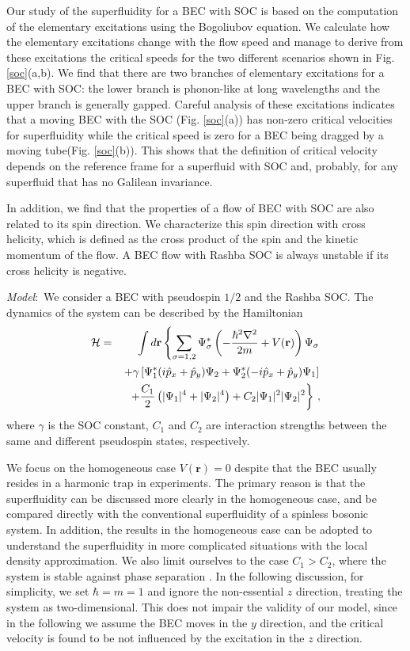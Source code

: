 \documentclass[doublecol]{epl2}
\begin{document}
Our study of the superfluidity for a BEC with SOC is based on the
computation of the elementary excitations using the Bogoliubov equation. We
calculate how the elementary excitations change with the flow speed and
manage to derive from these excitations the critical speeds for the two
different scenarios shown in Fig. \ref{soc}(a,b). We find that there are two
branches of elementary excitations for a BEC with SOC: the lower branch is
phonon-like at long wavelengths and the upper branch is generally gapped.
Careful analysis of these excitations indicates that a moving BEC with the
SOC (Fig. \ref{soc}(a)) has non-zero critical velocities for superfluidity
while the critical speed is zero for a BEC being dragged by a moving
tube(Fig. \ref{soc}(b)). This shows that the definition of critical velocity
depends on the reference frame for a superfluid with SOC and, probably, for
any superfluid that has no Galilean invariance.

In addition, we find that the properties of a flow of BEC with SOC are also
related to its spin direction. We characterize this spin direction with
cross helicity, which is defined as the cross product of the spin and the
kinetic momentum of the flow. A BEC flow with Rashba SOC is always unstable
if its cross helicity is negative.


\textit{Model}:~We consider a BEC with pseudospin $1/2$ and the Rashba SOC.
The dynamics of the system can be described by the Hamiltonian \cite%
{zhai1,merkl,larson,zhang}
\begin{eqnarray}
\mathcal{H} &=&\int d\mathbf{r}\left\{ \sum_{\sigma =1,2}\Psi _{\sigma
}^{\ast }\left( -\frac{\hbar ^{2}\nabla ^{2}}{2m}+V(\mathbf{r})\right) \Psi
_{\sigma }\right.   \notag \\
&&\left. +\gamma \left[ \Psi _{1}^{\ast }(i\hat{p}_{x}+\hat{p}_{y})\Psi
_{2}+\Psi _{2}^{\ast }(-i\hat{p}_{x}+\hat{p}_{y})\Psi _{1}\right] \right.
\notag \\
&&\left. +\frac{C_{1}}{2}\left( |\Psi _{1}|^{4}+|\Psi _{2}|^{4}\right)
+C_{2}|\Psi _{1}|^{2}|\Psi _{2}|^{2}\right\} \,,  \label{ham}
\end{eqnarray}%
where $\gamma $ is the SOC constant, $C_{1}$ and $C_{2}$ are interaction
strengths between the same and different pseudospin states, respectively.

We focus on the homogeneous case $V(\mathbf{r})=0$ despite that the BEC
usually resides in a harmonic trap in experiments. The primary reason is
that the superfluidity can be discussed more clearly in the homogeneous
case, and be compared directly with the conventional superfluidity of a
spinless bosonic system. In addition, the results in the homogeneous case
can be adopted to understand the superfluidity in more complicated
situations with the local density approximation. We also limit ourselves to
the case $C_{1}>C_{2}$, where the system is stable against phase separation
\cite{zhai1,zhang}. In the following discussion, for simplicity, we set $%
\hbar =m=1$ and ignore the non-essential $z$ direction, treating the system
as two-dimensional. This does not impair the validity of our model, since in the
following we assume the BEC moves in the $y$ direction, and the
critical velocity is found to be not influenced by the excitation in the $z$ direction.
\end{document}
